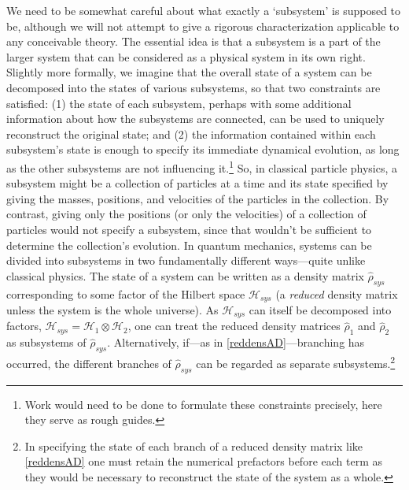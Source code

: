 \documentclass[onecolumn,secnumarabic,amsmath,amssymb,balancelastpage,nofootinbib]{article}
\begin{document}
We need to be somewhat careful about what exactly a `subsystem' is supposed to be, although we will not attempt to give a rigorous characterization applicable to any conceivable theory. The essential idea is that a subsystem is a part of the larger system that can be considered as a physical system in its own right. Slightly more formally, we imagine that the overall state of a system can be decomposed into the states of various subsystems, so that two constraints are satisfied: (1) the state of each subsystem, perhaps with some additional information about how the subsystems are connected, can be used to uniquely reconstruct the original state; and (2) the information contained within each subsystem's state is enough to specify its immediate dynamical evolution, as long as the other subsystems are not influencing it.\footnote{Work would need to be done to formulate these constraints precisely, here they serve as rough guides.} So, in classical particle physics, a subsystem might be a collection of particles at a time and its state specified by giving the masses, positions, and velocities of the particles in the collection.  By contrast, giving only the positions (or only the velocities) of a collection of particles would not specify a subsystem, since that wouldn't be sufficient to determine the collection's evolution. In quantum mechanics, systems can be divided into subsystems in two fundamentally different ways---quite unlike classical physics.  The state of a system can be written as a density matrix $\widehat{\rho}_{sys}$ corresponding to some factor of the Hilbert space $\mathscr{H}_{sys}$ (a \emph{reduced} density matrix unless the system is the whole universe).  As $\mathscr{H}_{sys}$ can itself be decomposed into factors, $\mathscr{H}_{sys}=\mathscr{H}_1\otimes\mathscr{H}_2$, one can treat the reduced density matrices $\widehat{\rho}_1$ and $\widehat{\rho}_2$ as subsystems of $\widehat{\rho}_{sys}$.  Alternatively, if---as in \eqref{reddensAD}---branching has occurred, the different branches of $\widehat{\rho}_{sys}$ can be regarded as separate subsystems.\footnote{In specifying the state of each branch of a reduced density matrix like \eqref{reddensAD} one must retain the numerical prefactors before each term as they would be necessary to reconstruct the state of the system as a whole.}
\end{document}
